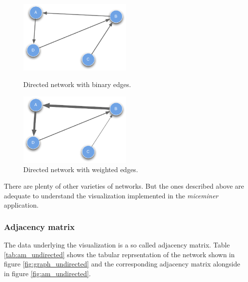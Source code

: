 \begin{figure}[htbp]
	\begin{minipage}[b]{0.5\textwidth}
    	\captionsetup{width=.5\textwidth}
		\centering
			\includegraphics[width=0.5\textwidth]{assets/pdf/graph_directed.pdf}
			\caption{Directed network with binary edges.}
			\label{fig:graph_directed}
	\end{minipage}
	\hspace{0.5cm}
	\begin{minipage}[b]{0.5\textwidth}
    \captionsetup{width=.5\textwidth}
		\centering
			\includegraphics[width=0.5\textwidth]{assets/pdf/graph_directed_weighted.pdf}
			\caption{Directed network with weighted edges.}
			\label{fig:graph_directed_weighted}
	\end{minipage}
\end{figure}

There are plenty of other varieties of networks. But the ones described above are adequate to understand the visualization implemented in the \textit{miceminer} application.

\subsubsection{Adjacency matrix}
\label{subsubsec:adjacency_matrix}

The data underlying the visualization is a so called adjacency matrix. Table \ref{tab:am_undirected} shows the tabular reprsentation of the network shown in figure \ref{fig:graph_undirected} and the corresponding adjacency matrix alongside in figure \ref{fig:am_undirected}.

